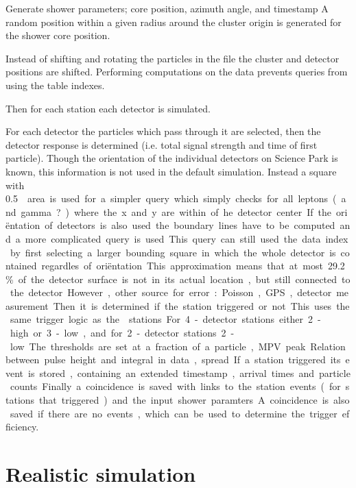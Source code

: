 Generate shower parameters; core position, azimuth angle, and timestamp
A random position within a given radius around the cluster origin is
generated for the shower core position.

Instead of shifting and rotating the particles in the \corsika file the
cluster and detector positions are shifted. Performing computations on
the \corsika data prevents queries from using the table indexes.

Then for each station each detector is simulated.

For each detector the particles which pass through it are selected, then the detector response is determined (i.e. total signal strength and time of first
particle). Though the orientation of the individual detectors on Science
Park is known, this information is not used in the default simulation.
Instead a square with \SI{.5}{\meter\square} area is used for a simpler query
which simply checks for all leptons (and gamma?) where the x and y are
within .. of he detector center. If the oriëntation of detectors is also
used the boundary lines have to be computed and a more complicated query
is used. This query can still used the data index by first selecting a
larger bounding square in which the whole detector is contained
regardles of oriëntation. This approximation means that at most
\SI{29.2}{\percent} of the detector surface is not in its actual
location, but still connected to the detector. However, other source for
error: Poisson, GPS, detector measurement.

Then it is determined if the station triggered or not. This uses the
same trigger logic as the \hisparc stations. For 4-detector stations
either 2-high or 3-low, and for 2-detector stations 2-low. The
thresholds are set at a fraction of a particle, MPV peak.. Relation
between pulse height and integral in data, spread..

If a station triggered its event is stored, containing an extended
timestamp, arrival times and particle counts.

Finally a coincidence is saved with links to the station events (for
stations that triggered) and the input shower paramters. A coincidence
is also saved if there are no events, which can be used to determine the
trigger efficiency.


\section{Realistic simulation}

